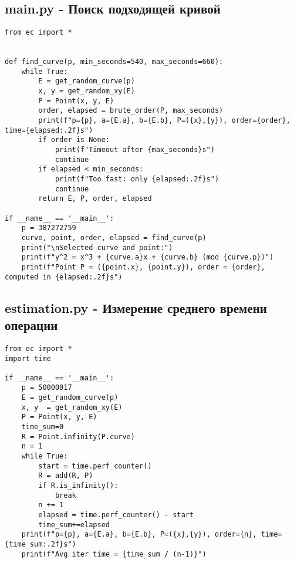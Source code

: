 \documentclass[a4paper,12pt]{article}
\begin{document}
\subsection{main.py - Поиск подходящей кривой}
\begin{lstlisting}
from ec import *


def find_curve(p, min_seconds=540, max_seconds=660):
    while True:
        E = get_random_curve(p)
        x, y = get_random_xy(E)
        P = Point(x, y, E)
        order, elapsed = brute_order(P, max_seconds)
        print(f"p={p}, a={E.a}, b={E.b}, P=({x},{y}), order={order}, time={elapsed:.2f}s")
        if order is None:
            print(f"Timeout after {max_seconds}s")
            continue
        if elapsed < min_seconds:
            print(f"Too fast: only {elapsed:.2f}s")
            continue
        return E, P, order, elapsed

if __name__ == '__main__':
    p = 387272759
    curve, point, order, elapsed = find_curve(p)
    print("\nSelected curve and point:")
    print(f"y^2 = x^3 + {curve.a}x + {curve.b} (mod {curve.p})")
    print(f"Point P = ({point.x}, {point.y}), order = {order}, computed in {elapsed:.2f}s")
\end{lstlisting}

\subsection{estimation.py - Измерение среднего времени операции}
\begin{lstlisting}
from ec import *
import time

if __name__ == '__main__':
    p = 50000017
    E = get_random_curve(p)
    x, y  = get_random_xy(E)
    P = Point(x, y, E)
    time_sum=0
    R = Point.infinity(P.curve)
    n = 1
    while True:
        start = time.perf_counter()
        R = add(R, P)
        if R.is_infinity():
            break
        n += 1
        elapsed = time.perf_counter() - start
        time_sum+=elapsed
    print(f"p={p}, a={E.a}, b={E.b}, P=({x},{y}), order={n}, time={time_sum:.2f}s")
    print(f"Avg iter time = {time_sum / (n-1)}")
\end{lstlisting}
\end{document}
